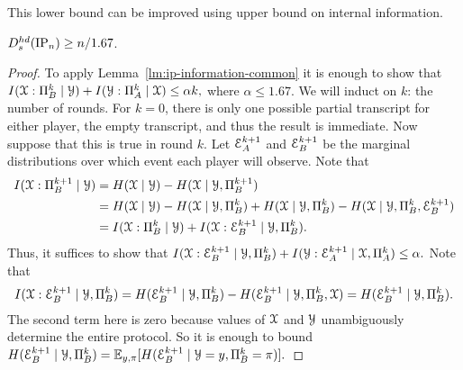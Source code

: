 This lower bound can be improved using upper bound on internal information.

\begin{theorem}\label{thm:hds-ip-information}
$D^{hd}_s(\mathrm{IP}_n)\ge n/1.67$.
\end{theorem}
\begin{proof}
    To apply Lemma~\ref{lm:ip-information-common} it is enough to show that 
    $I(\mathcal{X}:\Pi_B^k\mid\mathcal{Y}) + I(\mathcal{Y}:\Pi_A^k\mid\mathcal{X})\leq \alpha k,$ where     $\alpha\le 1.67$.
    We will induct on $k$: the number of rounds.
    For $k=0$, there is only one possible partial transcript for either player, the empty transcript, and thus the result is immediate.
    Now suppose that this is true in round $k$.
    Let $\mathcal{E}^{k+1}_A$ and $\mathcal{E}^{k+1}_B$ be the marginal distributions over which event each player will observe.
    Note that \begin{align*}
    I(\mathcal{X}:\Pi^{k+1}_B\mid\mathcal{Y})&=H(\mathcal{X}\mid\mathcal{Y})-H(\mathcal{X}\mid\mathcal{Y},\Pi^{k+1}_B)\\
    &=H(\mathcal{X}\mid\mathcal{Y})-H(\mathcal{X}\mid\mathcal{Y},\Pi^k_B)+H(\mathcal{X}\mid\mathcal{Y},\Pi^k_B)-H(\mathcal{X}\mid\mathcal{Y},\Pi^k_B,\mathcal{E}^{k+1}_B)\\
    &=I(\mathcal{X}:\Pi^k_B\mid\mathcal{Y})+I(\mathcal{X}:\mathcal{E}^{k+1}_B\mid\mathcal{Y},\Pi^k_B).
    \end{align*}
    Thus, it suffices to show that $I(\mathcal{X}:\mathcal{E}^{k+1}_B\mid\mathcal{Y},\Pi^k_B)+I(\mathcal{Y}:\mathcal{E}^{k+1}_A\mid\mathcal{X},\Pi^k_A)\leq \alpha.$ 
    Note that 
    \[
    I(\mathcal{X}:\mathcal{E}^{k+1}_B\mid\mathcal{Y},\Pi^k_B)
    = H(\mathcal{E}^{k+1}_B\mid\mathcal{Y},\Pi^k_B)-H(\mathcal{E}^{k+1}_B\mid\mathcal{Y},\Pi^k_B,\mathcal{X})
    = H(\mathcal{E}^{k+1}_B\mid\mathcal{Y},\Pi^k_B).
    \]
    The second term here is zero because values of $\mathcal{X}$ and $\mathcal{Y}$ unambiguously determine the entire protocol. 
    So it is enough to bound $H(\mathcal{E}^{k+1}_B\mid\mathcal{Y},\Pi^k_B) =\operatorname*{\mathbb{E}}_{y,\pi}[H(\mathcal{E}^{k+1}_B\mid\mathcal{Y}=y,\Pi^k_B=\pi)].$


\end{proof}
